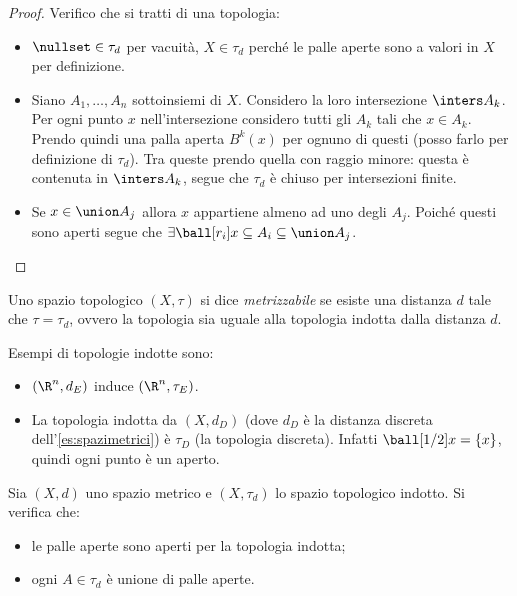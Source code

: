 \begin{proof}
	Verifico che si tratti di una topologia:
	\begin{itemize}
		\item
			$\nullset \in \tau_d$ per vacuità,
			$X \in \tau_d$ perché le palle aperte sono a valori in $X$ per definizione.
		\item
			Siano $A_1,\ldots,A_n$ sottoinsiemi di $X$.
			Considero la loro intersezione $\inters A_k$.
			Per ogni punto $x$ nell'intersezione considero tutti gli $A_k$ tali che $x \in A_k$.
			Prendo quindi una palla aperta $B^k(x)$ per ognuno di questi (posso farlo per definizione di $\tau_d$).
			Tra queste prendo quella con raggio minore: questa è contenuta in $\inters A_k$,
			segue che $\tau_d$ è chiuso per intersezioni finite.
		\item
			Se $x \in \union A_j$ allora $x$ appartiene almeno ad uno degli $A_j$.
			Poiché questi sono aperti segue che
			$\exists \ball[r_i]x \subseteq A_i \subseteq \union A_j$. \qedhere
	\end{itemize}
\end{proof}

\begin{defn}
	Uno spazio topologico $(X,\tau)$ si dice \emph{metrizzabile} se esiste una distanza $d$ tale che $\tau=\tau_d$,
	ovvero la topologia sia uguale alla topologia indotta dalla distanza $d$.
\end{defn}

\begin{es}
	Esempi di topologie indotte sono:
	\begin{itemize}
		\item $(\R^n,d_E)$  induce $(\R^n,\tau_E)$.
		\item La topologia indotta da $(X,d_D)$ (dove $d_D$ è la distanza discreta dell'\autoref{es:spazimetrici}) è $\tau_D$ (la topologia discreta).
		Infatti $\ball[1/2]x = \{x\}$, quindi ogni punto è un aperto.
	\end{itemize}
\end{es}

\begin{prop}
	\label{prop:apelle}
	Sia $(X,d)$ uno spazio metrico e $(X,\tau_d)$ lo spazio topologico indotto.
	Si verifica che:
	\begin{itemize}
		\item le palle aperte sono aperti per la topologia indotta;
		\item ogni $A \in \tau_d$ è unione di palle aperte.
	\end{itemize}
\end{prop}

